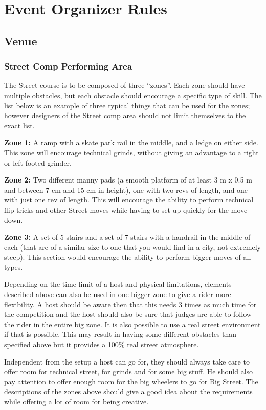 \chapter{Event Organizer Rules}

\section{Venue}

\subsection{Street Comp Performing Area \label{sec:flat-street_street-performing-area}}
The Street course is to be composed of three ``zones''.
Each zone should have multiple obstacles, but each obstacle should encourage a specific type of skill.
The list below is an example of three typical things that can be used for the zones; however designers of the Street comp area should not limit themselves to the exact list.

\textbf{Zone 1:}
A ramp with a skate park rail in the middle, and a ledge on either side.
This zone will encourage technical grinds, without giving an advantage to a right or left footed grinder.

\textbf{Zone 2:}
Two different manny pads (a smooth platform of at least 3 m x 0.5 m and between 7 cm and 15 cm in height), one with two revs of length, and one with just one rev of length.
This will encourage the ability to perform technical flip tricks and other Street moves while having to set up quickly for the move down.

\textbf{Zone 3:}
A set of 5 stairs and a set of 7 stairs with a handrail in the middle of each (that are of a similar size to one that you would find in a city, not extremely steep).
This section would encourage the ability to perform bigger moves of all types.

Depending on the time limit of a host and physical limitations, elements described above can also be used in one bigger zone to give a rider more flexibility.
A host should be aware then that this needs 3 times as much time for the competition and the host should also be sure that judges are able to follow the rider in the entire big zone.
It is also possible to use a real street environment if that is possible.
This may result in having some different obstacles than specified above but it provides a 100\% real street atmosphere.

Independent from the setup a host can go for, they should always take care to offer room for technical street, for grinds and for some big stuff.
He should also pay attention to offer enough room for the big wheelers to go for Big Street.
The descriptions of the zones above should give a good idea about the requirements while offering a lot of room for being creative.

